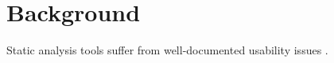 \chapter{Background}
\label{ch:background}

Static analysis tools suffer from well-documented usability issues \cite{CB16,JSMB13}.